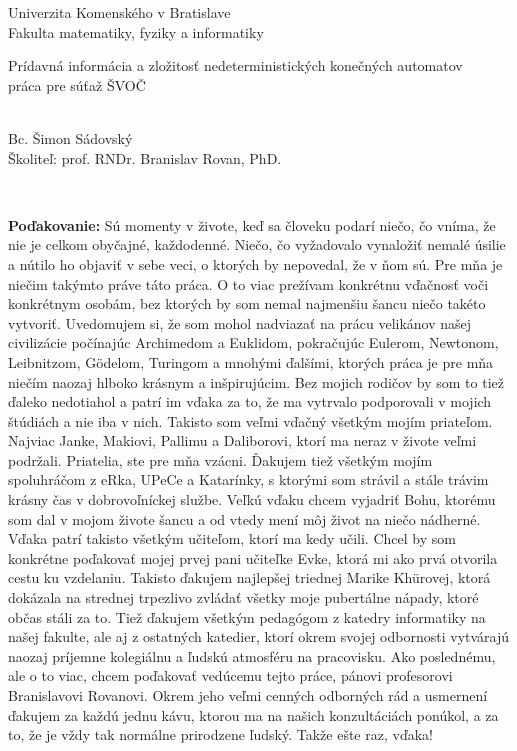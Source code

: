 \documentclass[12pt, oneside]{book}
\def\mfrok{2017}
\def\mfnazov{Prídavná informácia a zložitosť nedeterministických konečných automatov}
\def\mftyp{práca pre súťaž ŠVOČ}
\def\mfautor{Bc. Šimon Sádovský}
\def\mfskolitel{prof. RNDr. Branislav Rovan, PhD.}
\begin{document}
     

\thispagestyle{empty}

\begin{center}
\sc\large
Univerzita Komenského v Bratislave\\
Fakulta matematiky, fyziky a informatiky

\vfill

{\LARGE\mfnazov}\\
\mftyp
\end{center}

\vfill

{\sc\large 
\noindent \mfrok \\ \mfautor \\ Školiteľ: \mfskolitel
}

\eject %

\frontmatter

\setcounter{page}{3}
\newpage 
~

\vfill
{\bf Poďakovanie:}
Sú momenty v živote, keď sa človeku podarí niečo, čo vníma, že nie je celkom obyčajné, každodenné. Niečo, čo vyžadovalo vynaložiť nemalé úsilie a nútilo ho objaviť v sebe veci, o ktorých by nepovedal, že v ňom sú. Pre mňa je niečim takýmto práve táto práca. O to viac prežívam konkrétnu vďačnosť voči konkrétnym osobám, bez ktorých by som nemal najmenšiu šancu niečo takéto vytvoriť. Uvedomujem si, že som mohol nadviazať na prácu velikánov našej civilizácie počínajúc Archimedom a Euklidom, pokračujúc Eulerom, Newtonom, Leibnitzom, Gödelom, Turingom a mnohými ďalšími, ktorých práca je pre mňa niečím naozaj hlboko krásnym a inšpirujúcim. Bez mojich rodičov by som to tiež ďaleko nedotiahol a patrí im vďaka za to, že ma vytrvalo podporovali v mojich štúdiách a nie iba v nich. Takisto som veľmi vďačný všetkým mojím priateľom. Najviac Janke, Makiovi, Pallimu a Daliborovi, ktorí ma neraz v živote veľmi podržali. Priatelia, ste pre mňa vzácni. Ďakujem tiež všetkým mojím spoluhráčom z eRka, UPeCe a Katarínky, s ktorými som strávil a stále trávim krásny čas v dobrovoľníckej službe. Veľkú vďaku chcem vyjadriť Bohu, ktorému som dal v mojom živote šancu a od vtedy mení môj život na niečo nádherné. Vďaka patrí takisto všetkým učiteľom, ktorí ma kedy učili. Chcel by som konkrétne poďakovať mojej prvej pani učiteľke Evke, ktorá mi ako prvá otvorila cestu ku vzdelaniu. Takisto ďakujem najlepšej triednej Marike Khürovej, ktorá dokázala na strednej trpezlivo zvládať všetky moje pubertálne nápady, ktoré občas stáli za to. Tiež ďakujem všetkým pedagógom z katedry informatiky na našej fakulte, ale aj z ostatných katedier, ktorí okrem svojej odbornosti vytvárajú naozaj príjemne kolegiálnu a ľudskú atmosféru na pracovisku. Ako poslednému, ale o to viac, chcem poďakovať vedúcemu tejto práce, pánovi profesorovi Branislavovi Rovanovi. Okrem jeho veľmi cenných odborných rád a usmernení ďakujem za každú jednu kávu, ktorou ma na našich konzultáciách ponúkol, a za to, že je vždy tak normálne prirodzene ľudský. Takže ešte raz, vďaka!
\end{document}
